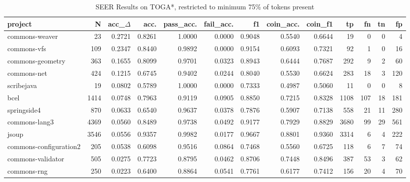 \begin{table*}
\centering
\caption{SEER Results on TOGA*, restricted to minimum 75\% of tokens present}
\label{tab:toga_results_25}
\begin{tabular}{lrrrrrrrrrrrr}
\toprule
                project &      N &  acc\_$\Delta$ &    acc. &  pass\_acc. &  fail\_acc. &      f1 &  coin\_acc. &  coin\_f1 &     tp &   fn &   tn &    fp \\
\midrule
         commons-weaver &     23 &      0.2721 &  0.8261 &     1.0000 &     0.0000 &  0.9048 &     0.5540 &   0.6644 &     19 &    0 &    0 &     4 \\
            commons-vfs &    109 &      0.2347 &  0.8440 &     0.9892 &     0.0000 &  0.9154 &     0.6093 &   0.7321 &     92 &    1 &    0 &    16 \\
       commons-geometry &    363 &      0.1655 &  0.8099 &     0.9701 &     0.0323 &  0.8943 &     0.6444 &   0.7687 &    292 &    9 &    2 &    60 \\
            commons-net &    424 &      0.1215 &  0.6745 &     0.9402 &     0.0244 &  0.8040 &     0.5530 &   0.6624 &    283 &   18 &    3 &   120 \\
             scribejava &     19 &      0.0802 &  0.5789 &     1.0000 &     0.0000 &  0.7333 &     0.4987 &   0.5060 &     11 &    0 &    0 &     8 \\
                   bcel &   1414 &      0.0748 &  0.7963 &     0.9119 &     0.0905 &  0.8850 &     0.7215 &   0.8328 &   1108 &  107 &   18 &   181 \\
            springside4 &    870 &      0.0633 &  0.6540 &     0.9637 &     0.0378 &  0.7876 &     0.5907 &   0.7138 &    558 &   21 &   11 &   280 \\
          commons-lang3 &   4369 &      0.0560 &  0.8489 &     0.9738 &     0.0492 &  0.9177 &     0.7929 &   0.8829 &   3680 &   99 &   29 &   561 \\
                  jsoup &   3546 &      0.0556 &  0.9357 &     0.9982 &     0.0177 &  0.9667 &     0.8801 &   0.9360 &   3314 &    6 &    4 &   222 \\
 commons-configuration2 &    205 &      0.0538 &  0.6098 &     0.9516 &     0.0864 &  0.7468 &     0.5560 &   0.6725 &    118 &    6 &    7 &    74 \\
      commons-validator &    505 &      0.0275 &  0.7723 &     0.8795 &     0.0462 &  0.8706 &     0.7448 &   0.8496 &    387 &   53 &    3 &    62 \\
            commons-rng &    250 &      0.0223 &  0.6400 &     0.8864 &     0.0541 &  0.7761 &     0.6177 &   0.7412 &    156 &   20 &    4 &    70 \\

\end{tabular}
\end{table*}
